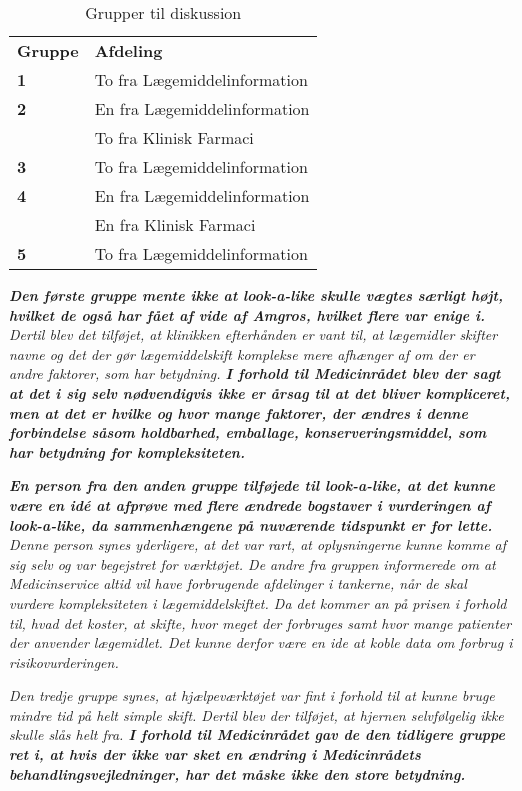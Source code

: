 \begin{table}[H]
\caption{Grupper til diskussion}
\vspace{2mm}
\label{table:grupper}
\centering
\begin{tabular}{l|l}
\rowcolor[HTML]{C0C0C0} \textbf{Gruppe} & \textbf{Afdeling} \\
\textbf{1} & To fra Lægemiddelinformation \\ \hline
\textbf{2} \multirow{2}{*}{} & En fra Lægemiddelinformation \\  & To fra  Klinisk Farmaci\\ \hline
\textbf{3} & To fra Lægemiddelinformation \\ \hline
\textbf{4}\multirow{2}{*}{} & En fra Lægemiddelinformation \\  & En fra Klinisk Farmaci \\ \hline
\textbf{5} & To fra Lægemiddelinformation \\ 
\end{tabular}
\end{table}

\textit{\textbf{Den første gruppe mente ikke at look-a-like skulle vægtes særligt højt, hvilket de også har fået af vide af Amgros, hvilket flere var enige i.} Dertil blev det tilføjet, at klinikken efterhånden er vant til, at lægemidler skifter navne og det der gør lægemiddelskift komplekse mere afhænger af om der er andre faktorer, som har betydning.\textbf{ I forhold til Medicinrådet blev der sagt at det i sig selv nødvendigvis ikke er årsag til at det bliver kompliceret, men at det er hvilke og hvor mange faktorer, der ændres i denne forbindelse såsom holdbarhed, emballage, konserveringsmiddel, som har betydning for kompleksiteten.}}

\textit{\textbf{En person fra den anden gruppe tilføjede til look-a-like, at det kunne være en idé at afprøve med flere ændrede bogstaver i vurderingen af look-a-like, da sammenhængene på nuværende tidspunkt er for lette.} Denne person synes yderligere, at det var rart, at oplysningerne kunne komme af sig selv og var begejstret for værktøjet. De andre fra gruppen informerede om at Medicinservice altid vil have forbrugende afdelinger i tankerne, når de skal vurdere kompleksiteten i lægemiddelskiftet. Da det kommer an på prisen i forhold til, hvad det koster, at skifte, hvor meget der forbruges samt hvor mange patienter der anvender lægemidlet. Det kunne derfor være en ide at koble data om forbrug i risikovurderingen.}

\textit{Den tredje gruppe synes, at hjælpeværktøjet var fint i forhold til at kunne bruge mindre tid på helt simple skift. Dertil blev der tilføjet, at hjernen selvfølgelig ikke skulle slås helt fra. \textbf{I forhold til Medicinrådet gav de den tidligere gruppe ret i, at hvis der ikke var sket en ændring i Medicinrådets behandlingsvejledninger, har det måske ikke den store betydning.}}

